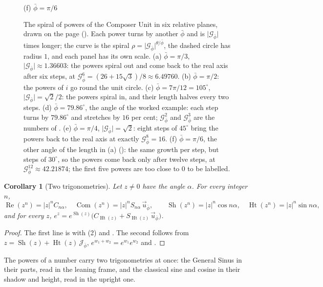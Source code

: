\documentclass[11pt,a4paper]{amsart}
\theoremstyle{plain}
\newtheorem{corollary}[theorem]{Corollary}
\theoremstyle{definition}
\theoremstyle{remark}
\newcommand{\pb}{\bar{\phi}}                     %
\newcommand{\Gp}{\mathcal{G}_{\bar{\phi}}}       %
\newcommand{\up}{\vec{u}_{\bar{\phi}}}           %
\newcommand{\Jp}{\mathcal{J}_{\bar{\phi}}}       %
\renewcommand{\Re}{\operatorname{Re}}            %
\DeclareMathOperator{\Com}{Com}                  %
\DeclareMathOperator{\Sh}{Sh}                    %
\DeclareMathOperator{\Ht}{Ht}                    %
\begin{document}
\begin{figure}[tb]
\begin{minipage}[b]{0.32\textwidth}
\smallskip
{\footnotesize (f) $\pb = \pi/6$\par}
\end{minipage}
\caption{The spiral of powers of the Composer Unit in six relative planes, drawn on the page (). Each power turns by another $\pb$ and is $\lvert\Gp\rvert$ times longer; the curve is the spiral $\rho = \lvert\Gp\rvert^{\theta/\pb}$, the dashed circle has radius $1$, and each panel has its own scale. (a) $\pb = \pi/3$, $\lvert\Gp\rvert \approx 1.36603$: the powers spiral out and come back to the real axis after six steps, at $\Gp^6 = (26 + 15\sqrt{3})/8 \approx 6.49760$. (b) $\pb = \pi/2$: the powers of $i$ go round the unit circle. (c) $\pb = 7\pi/12 = 105^\circ$, $\lvert\Gp\rvert = \sqrt{2}/2$: the powers spiral in, and their length halves every two steps. (d) $\pb = 79.86^\circ$, the angle of the worked example: each step turns by $79.86^\circ$ and stretches by $16$ per cent; $\Gp^2$ and $\Gp^3$ are the numbers of . (e) $\pb = \pi/4$, $\lvert\Gp\rvert = \sqrt{2}$: eight steps of $45^\circ$ bring the powers back to the real axis at exactly $\Gp^8 = 16$. (f) $\pb = \pi/6$, the other angle of the length in (a) (): the same growth per step, but steps of $30^\circ$, so the powers come back only after twelve steps, at $\Gp^{12} \approx 42.21874$; the first five powers are too close to $0$ to be labelled.}
\label{fig:spiral}
\end{figure}

\begin{corollary}[Two trigonometries]\label{cor:two-trig}
Let $z \neq 0$ have the angle $\alpha$. For every integer $n$,
\[
\Re(z^n) = \lvert z\rvert^n C_{n\alpha} , \quad \Com(z^n) = \lvert z\rvert^n S_{n\alpha}\,\up , \qquad \Sh(z^n) = \lvert z\rvert^n\cos n\alpha , \quad \Ht(z^n) = \lvert z\rvert^n\sin n\alpha ,
\]
and for every $z$, $e^{z} = e^{\Sh(z)}\bigl(C_{\Ht(z)} + S_{\Ht(z)}\,\up\bigr)$.
\end{corollary}

\begin{proof}
The first line is  with (2) and . The second follows from $z = \Sh(z) + \Ht(z)\,\Jp$, $e^{w_1 + w_2} = e^{w_1}e^{w_2}$ and .
\end{proof}

The powers of a number carry two trigonometries at once: the General Sinus in their parts, read in the leaning frame, and the classical sine and cosine in their shadow and height, read in the upright one.
\end{document}

